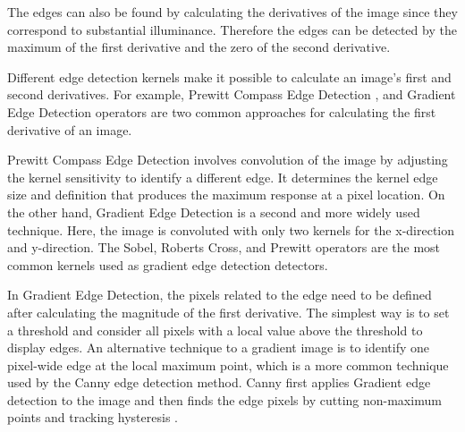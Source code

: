 The edges can also be found by calculating the derivatives of the image since they correspond to substantial illuminance. Therefore the edges can be detected by the maximum of the first derivative and the zero of the second derivative.

Different edge detection kernels make it possible to calculate an image's first and second derivatives. For example, Prewitt Compass Edge Detection \cite{prewitt1970object}, and Gradient Edge Detection operators \cite{bovik2010handbook} are two common approaches for calculating the first derivative of an image. 

Prewitt Compass Edge Detection involves convolution of the image by adjusting the kernel sensitivity to identify a different edge. It determines the kernel edge size and definition that produces the maximum response at a pixel location. On the other hand, Gradient Edge Detection is a second and more widely used technique. Here, the image is convoluted with only two kernels for the x-direction and y-direction. The Sobel, Roberts Cross, and Prewitt operators are the most common kernels used as gradient edge detection detectors.

In Gradient Edge Detection, the pixels related to the edge need to be defined after calculating the magnitude of the first derivative. The simplest way is to set a threshold and consider all pixels with a local value above the threshold to display edges. An alternative technique to a gradient image is to identify one pixel-wide edge at the local maximum point, which is a more common technique used by the Canny edge detection method. Canny first applies Gradient edge detection to the image and then finds the edge pixels by cutting non-maximum points and tracking hysteresis \cite{moeslund2009image}.
